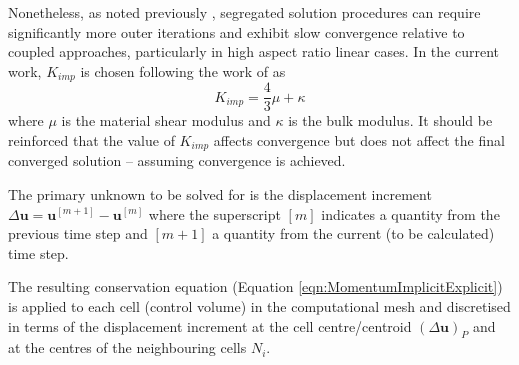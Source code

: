 \documentclass[sn-mathphys,Numbered]{sn-jnl}%
\newcommand{\bb}{\boldsymbol}
\begin{document}
Nonetheless, as noted previously \citep{cardiff_block-coupled_2016}, segregated solution procedures can require significantly more outer iterations and exhibit slow convergence relative to coupled approaches, particularly in high aspect ratio linear cases.
In the current work, 
$K_{imp}$ is chosen following the work of \citet{jasak_application_2000} as %
\begin{equation}
	K_{imp} = \frac{4}{3}\mu + \kappa
\end{equation}
where $\mu$ is the material shear modulus and $\kappa$ is the bulk modulus.
It should be reinforced that the value of $K_{imp}$ affects convergence but does not affect the final converged solution -- assuming convergence is achieved.

The primary unknown to be solved for is the displacement increment $\Delta \boldsymbol{u}=\boldsymbol{u}^{[m+1]}-\boldsymbol{u}^{[m]}$ where the superscript $[m]$ indicates a quantity from the previous time step and $[m+1]$ a quantity from the current (to be calculated) time step. 

The resulting conservation equation (Equation \ref{eqn:MomentumImplicitExplicit}) is applied to each cell (control volume) in the computational mesh and discretised in terms of the displacement increment at the cell centre/centroid $(\Delta \bb{u})_P$ and at the centres of the neighbouring cells $N_i$.
\end{document}
